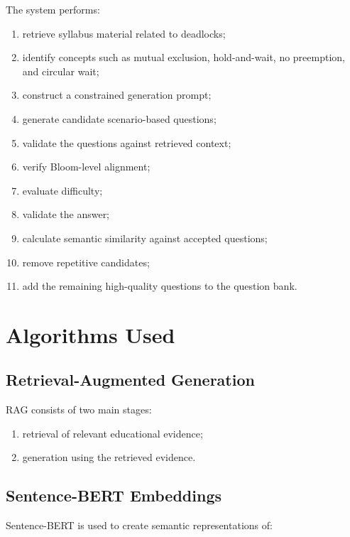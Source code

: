 \documentclass[12pt,a4paper]{report}
\begin{document}
The system performs:

\begin{enumerate}
    \item retrieve syllabus material related to deadlocks;
    \item identify concepts such as mutual exclusion, hold-and-wait, no preemption, and circular wait;
    \item construct a constrained generation prompt;
    \item generate candidate scenario-based questions;
    \item validate the questions against retrieved context;
    \item verify Bloom-level alignment;
    \item evaluate difficulty;
    \item validate the answer;
    \item calculate semantic similarity against accepted questions;
    \item remove repetitive candidates;
    \item add the remaining high-quality questions to the question bank.
\end{enumerate}


\section{Algorithms Used}

\subsection{Retrieval-Augmented Generation}

RAG consists of two main stages:

\begin{enumerate}
    \item retrieval of relevant educational evidence;
    \item generation using the retrieved evidence.
\end{enumerate}

\subsection{Sentence-BERT Embeddings}

Sentence-BERT is used to create semantic representations of:
\end{document}
